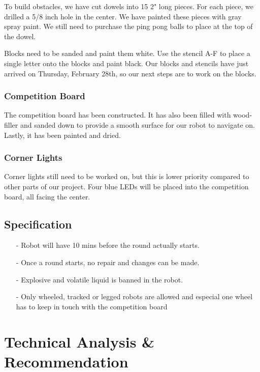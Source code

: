 \documentclass[12pt]{article}
\begin{document}
To build obstacles, we have cut dowels into 15 2" long pieces. For each piece, we drilled a 5/8 inch hole in the center. We have painted these pieces with gray spray paint. We still need to purchase the ping pong balls to place at the top of the dowel.

Blocks need to be sanded and paint them white. Use the stencil A-F to place a single letter onto the blocks and paint black. Our blocks and stencils have just arrived on Thursday, February 28th, so our next steps are to work on the blocks.

\subsubsection{Competition Board}

The competition board has been constructed. It has also been filled with wood-filler and sanded down to provide a smooth surface for our robot to navigate on. Lastly, it has been painted and dried.

\subsubsection{Corner Lights}

Corner lights still need to be worked on, but this is lower priority compared to other parts of our project. Four blue LEDs will be placed into the competition board, all facing the center.

\subsection{Specification}

\begin{itemize}[noitemsep]
	\item[-] Robot will have 10 mins before the round actually starts.
	\item[-] Once a round starts, no repair and changes can be made. 
	\item[-] Explosive and volatile liquid is banned in the robot.
	\item[-] Only wheeled, tracked or legged robots are allowed and especial one wheel has to keep in touch with the competition board
\end{itemize}

\section{Technical Analysis \& Recommendation}
\end{document}
